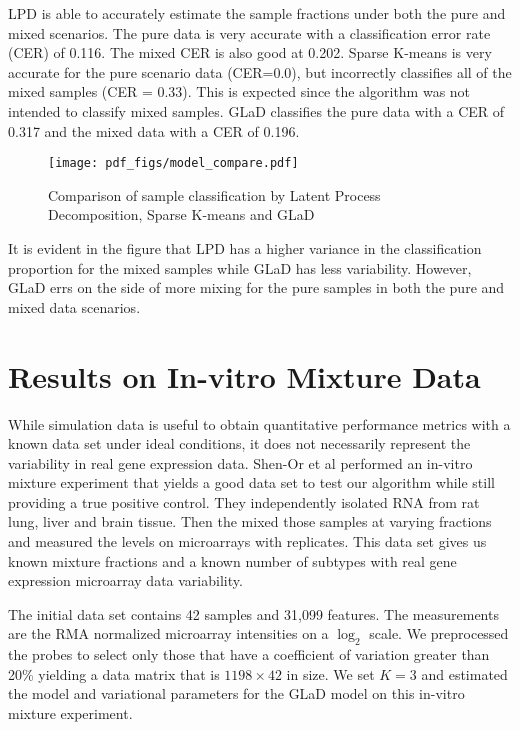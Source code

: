 \documentclass[11pt]{amsart}
\begin{document}
LPD is able to accurately estimate the sample fractions under both the pure and mixed scenarios. The pure data is very accurate with a classification error rate (CER) of 0.116. The mixed CER is also good at 0.202. Sparse K-means is very accurate for the pure scenario data (CER=0.0), but incorrectly classifies all of the mixed samples (CER = 0.33). This is expected since the algorithm was not intended to classify mixed samples. GLaD classifies the pure data with a CER of 0.317 and the mixed data with a CER of 0.196. 

\begin{figure}[htbp]
\begin{center}
\texttt{[image: pdf\_figs/model\_compare.pdf]}
\caption{Comparison of sample classification by Latent Process Decomposition, Sparse K-means and GLaD }
\label{fig:model_compare}
\end{center}
\end{figure}

It is evident in the figure that LPD has a higher variance in the classification proportion for the mixed samples while GLaD has less variability. However, GLaD errs on the side of more mixing for the pure samples in both the pure and mixed data scenarios.


\section{Results on In-vitro Mixture Data}

While simulation data is useful to obtain quantitative performance metrics with a known data set under ideal conditions, it does not necessarily represent the variability in real gene expression data. Shen-Or et al performed an in-vitro mixture experiment that yields a good data set to test our algorithm while still providing a true positive control. They independently isolated RNA from rat lung, liver and brain tissue. Then the mixed those samples at varying fractions and measured the levels on microarrays with replicates. This data set gives us known mixture fractions and a known number of subtypes with real gene expression microarray data variability.

The initial data set contains 42 samples and 31,099 features. The measurements are the RMA normalized microarray intensities on a $\log_2$ scale. We preprocessed the probes to select only those that have a coefficient of variation greater than 20\% yielding a data matrix that is $1198 \times 42$ in size. We set $K=3$ and estimated the model and variational parameters for the GLaD model on this in-vitro mixture experiment. 
\end{document}
